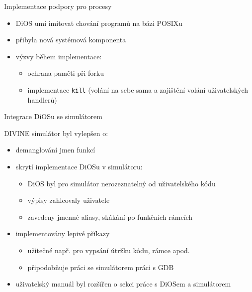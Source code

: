 \documentclass[large,ignorenonframetext,aspectratio=169,]{paradise-slide}
\providecommand{\tightlist}{%
  \setlength{\itemsep}{0pt}\setlength{\parskip}{0pt}}
\begin{document}
\begin{frame}[fragile]{Implementace podpory pro procesy}
\protect\hypertarget{implementace-podpory-pro-procesy}{}

\begin{itemize}
\tightlist
\item
  DiOS umí imitovat chování programů na bázi POSIXu
\item
  přibyla nová systémová komponenta
\end{itemize}

\pause

\begin{itemize}
\tightlist
\item
  výzvy během implementace:

  \begin{itemize}
  \tightlist
  \item
    ochrana paměti při forku
  \item
    implementace \texttt{kill} (volání na sebe sama a zajištění volání
    uživatelských handlerů)
  \end{itemize}
\end{itemize}

\end{frame}

\begin{frame}{Integrace DiOSu se simulátorem}
\protect\hypertarget{integrace-diosu-se-simuluxe1torem}{}

DIVINE simulátor byl vylepšen o:

\begin{itemize}
\tightlist
\item
  demanglování jmen funkcí
\item
  skrytí implementace DiOSu v simulátoru:

  \begin{itemize}
  \tightlist
  \item
    DiOS byl pro simulátor nerozeznatelný od uživatelského kódu
  \item
    výpisy zahlcovaly uživatele
  \item
    zavedeny jmenné aliasy, skákání po funkčních rámcích
  \end{itemize}
\item
  implementovány lepivé příkazy

  \begin{itemize}
  \tightlist
  \item
    užitečné např. pro vypsání útržku kódu, rámce apod.
  \item
    připodobňuje práci se simulátorem práci s GDB
  \end{itemize}
\item
  uživatelský manuál byl rozšířen o sekci práce s DiOSem a simulátorem
\end{itemize}

\end{frame}
\end{document}
